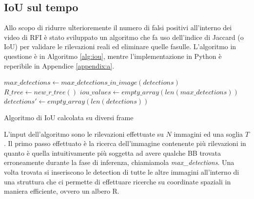 \subsection{IoU sul tempo}
\label{sec:iou_over_time}
Allo scopo di ridurre ulterioremente il numero di falsi positivi all'interno dei video di \ac{RFI} è stato sviluppato un algoritmo che fa uso dell'indice di Jaccard (o \ac{IoU}) per validare le rilevazioni reali ed eliminare quelle fasulle. 
L'algoritmo in questione è in Algoritmo \ref{alg:iou}, mentre l'implementazione in Python è reperibile in Appendice \ref{appendix:a}.


\begin{algorithm}[H]
    \SetAlgoLined
    $ max\_detections \leftarrow max\_detections\_in\_image(detections)$ \;
    $ R\_tree \leftarrow new\_r\_tree() $\;
    $iou\_values \leftarrow empty\_array(len(max\_detections))$\;
    $detections' \leftarrow empty\_array(len(detections))$\;
    \caption{Algoritmo di IoU calcolata su diversi frame}
    \label{alg:iou}
\end{algorithm}

L'input dell'algoritmo sono le rilevazioni effettuate su $N$ immagini ed una soglia $T$. 
Il primo passo effettuato è la ricerca dell'immagine contenente più rilevazioni in quanto è quella intuitivamente più soggetta ad avere qualche \ac{BB} trovata erroneamente durante la fase di inferenza, chiamiamola \textit{max\_detections}. Una volta trovata si inseriscono le detection di tutte le altre immagini all'interno di una struttura che ci permette di effettuare ricerche su coordinate spaziali in maniera efficiente, ovvero un albero R.

